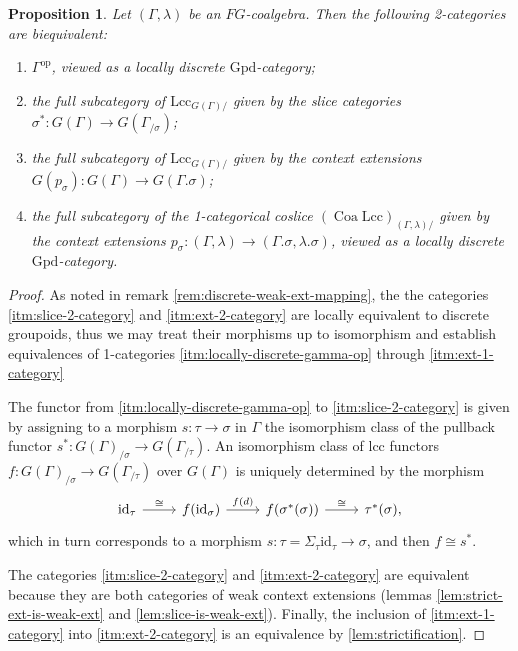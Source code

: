 \documentclass[a4paper]{article}
\newtheorem{proposition}[theorem]{Proposition}
\theoremstyle{remark}
\theoremstyle{definition}
\begin{document}
\begin{proposition}
  \label{prop:cats-of-weak-exts}
  Let $(\Gamma, \lambda)$ be an $FG$-coalgebra.
  Then the following 2-categories are biequivalent:
  \begin{enumerate}
    \item
      \label{itm:locally-discrete-gamma-op}
      $\Gamma^\mathrm{op}$, viewed as a locally discrete $\mathrm{Gpd}$-category;
    \item
      \label{itm:slice-2-category}
      the full subcategory of $\mathrm{Lcc}_{G(\Gamma) /}$ given by the slice categories $\sigma^* : G(\Gamma) \rightarrow G(\Gamma_{/ \sigma})$;
    \item
      \label{itm:ext-2-category}
      the full subcategory of $\mathrm{Lcc}_{G(\Gamma) /}$ given by the context extensions $G(p_\sigma) : G(\Gamma) \rightarrow G(\Gamma.\sigma)$;
    \item
      \label{itm:ext-1-category}
      the full subcategory of the 1-categorical coslice $(\operatorname{Coa} \mathrm{Lcc})_{(\Gamma, \lambda) /}$ given by the context extensions $p_\sigma : (\Gamma, \lambda) \rightarrow (\Gamma.\sigma, \lambda.\sigma)$, viewed as a locally discrete $\mathrm{Gpd}$-category.
  \end{enumerate}
\end{proposition}
\begin{proof}
  As noted in remark \ref{rem:discrete-weak-ext-mapping}, the the categories \ref{itm:slice-2-category} and \ref{itm:ext-2-category} are locally equivalent to discrete groupoids, thus we may treat their morphisms up to isomorphism and establish equivalences of 1-categories \ref{itm:locally-discrete-gamma-op} through \ref{itm:ext-1-category}

  The functor from \ref{itm:locally-discrete-gamma-op} to \ref{itm:slice-2-category} is given by assigning to a morphism $s : \tau \rightarrow \sigma$ in $\Gamma$ the isomorphism class of the pullback functor $s^* : G(\Gamma)_{/ \sigma} \rightarrow G(\Gamma_{/ \tau})$.
  An isomorphism class of lcc functors $f : G(\Gamma)_{/ \sigma} \rightarrow G(\Gamma_{/ \tau})$ over $G(\Gamma)$ is uniquely determined by the morphism
  \begin{equation}
    \begin{tikzcd}
      \mathrm{id}_\tau \arrow[r, "\cong"] & f(\mathrm{id}_\sigma) \arrow[r, "f(d)"] & f(\sigma^*(\sigma)) \arrow[r, "\cong"] & \tau^*(\sigma),
    \end{tikzcd}
  \end{equation}
  which in turn corresponds to a morphism $s : \tau = \Sigma_\tau \mathrm{id}_\tau \rightarrow \sigma$, and then $f \cong s^*$.

  The categories \ref{itm:slice-2-category} and \ref{itm:ext-2-category} are equivalent because they are both categories of weak context extensions (lemmas \ref{lem:strict-ext-is-weak-ext} and \ref{lem:slice-is-weak-ext}).
  Finally, the inclusion of \ref{itm:ext-1-category} into \ref{itm:ext-2-category} is an equivalence by \ref{lem:strictification}.
\end{proof}
\end{document}
